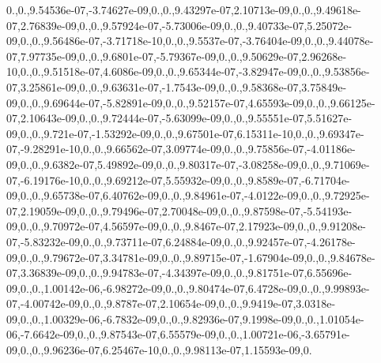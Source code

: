 {0.,0.,9.\-54536e-\/07,-\/3.\-74627e-\/09,0.,0.,9.\-43297e-\/07,2.\-10713e-\/09,0.,0.,9.\-49618e-\/07,2.\-76839e-\/09,0.,0.,9.\-57924e-\/07,-\/5.\-73006e-\/09,0.,0.,9.\-40733e-\/07,5.\-25072e-\/09,0.,0.,9.\-56486e-\/07,-\/3.\-71718e-\/10,0.,0.,9.\-5537e-\/07,-\/3.\-76404e-\/09,0.,0.,9.\-44078e-\/07,7.\-97735e-\/09,0.,0.,9.\-6801e-\/07,-\/5.\-79367e-\/09,0.,0.,9.\-50629e-\/07,2.\-96268e-\/10,0.,0.,9.\-51518e-\/07,4.\-6086e-\/09,0.,0.,9.\-65344e-\/07,-\/3.\-82947e-\/09,0.,0.,9.\-53856e-\/07,3.\-25861e-\/09,0.,0.,9.\-63631e-\/07,-\/1.\-7543e-\/09,0.,0.,9.\-58368e-\/07,3.\-75849e-\/09,0.,0.,9.\-69644e-\/07,-\/5.\-82891e-\/09,0.,0.,9.\-52157e-\/07,4.\-65593e-\/09,0.,0.,9.\-66125e-\/07,2.\-10643e-\/09,0.,0.,9.\-72444e-\/07,-\/5.\-63099e-\/09,0.,0.,9.\-55551e-\/07,5.\-51627e-\/09,0.,0.,9.\-721e-\/07,-\/1.\-53292e-\/09,0.,0.,9.\-67501e-\/07,6.\-15311e-\/10,0.,0.,9.\-69347e-\/07,-\/9.\-28291e-\/10,0.,0.,9.\-66562e-\/07,3.\-09774e-\/09,0.,0.,9.\-75856e-\/07,-\/4.\-01186e-\/09,0.,0.,9.\-6382e-\/07,5.\-49892e-\/09,0.,0.,9.\-80317e-\/07,-\/3.\-08258e-\/09,0.,0.,9.\-71069e-\/07,-\/6.\-19176e-\/10,0.,0.,9.\-69212e-\/07,5.\-55932e-\/09,0.,0.,9.\-8589e-\/07,-\/6.\-71704e-\/09,0.,0.,9.\-65738e-\/07,6.\-40762e-\/09,0.,0.,9.\-84961e-\/07,-\/4.\-0122e-\/09,0.,0.,9.\-72925e-\/07,2.\-19059e-\/09,0.,0.,9.\-79496e-\/07,2.\-70048e-\/09,0.,0.,9.\-87598e-\/07,-\/5.\-54193e-\/09,0.,0.,9.\-70972e-\/07,4.\-56597e-\/09,0.,0.,9.\-8467e-\/07,2.\-17923e-\/09,0.,0.,9.\-91208e-\/07,-\/5.\-83232e-\/09,0.,0.,9.\-73711e-\/07,6.\-24884e-\/09,0.,0.,9.\-92457e-\/07,-\/4.\-26178e-\/09,0.,0.,9.\-79672e-\/07,3.\-34781e-\/09,0.,0.,9.\-89715e-\/07,-\/1.\-67904e-\/09,0.,0.,9.\-84678e-\/07,3.\-36839e-\/09,0.,0.,9.\-94783e-\/07,-\/4.\-34397e-\/09,0.,0.,9.\-81751e-\/07,6.\-55696e-\/09,0.,0.,1.\-00142e-\/06,-\/6.\-98272e-\/09,0.,0.,9.\-80474e-\/07,6.\-4728e-\/09,0.,0.,9.\-99893e-\/07,-\/4.\-00742e-\/09,0.,0.,9.\-8787e-\/07,2.\-10654e-\/09,0.,0.,9.\-9419e-\/07,3.\-0318e-\/09,0.,0.,1.\-00329e-\/06,-\/6.\-7832e-\/09,0.,0.,9.\-82936e-\/07,9.\-1998e-\/09,0.,0.,1.\-01054e-\/06,-\/7.\-6642e-\/09,0.,0.,9.\-87543e-\/07,6.\-55579e-\/09,0.,0.,1.\-00721e-\/06,-\/3.\-65791e-\/09,0.,0.,9.\-96236e-\/07,6.\-25467e-\/10,0.,0.,9.\-98113e-\/07,1.\-15593e-\/09,0.}
